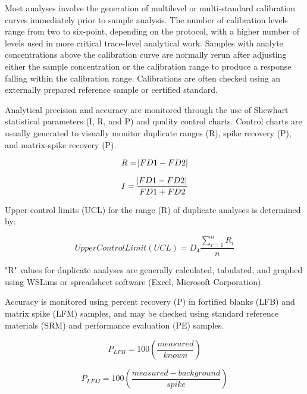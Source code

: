 Most analyses involve the generation of multilevel or multi-standard 
calibration curves immediately prior to sample analysis. The number of 
calibration levels range from two to six-point, depending on the 
protocol, with a higher number of levels used in more critical 
trace-level analytical work. Samples with analyte concentrations above 
the calibration curve are normally rerun after adjusting either the 
sample concentration or the calibration range to produce a response 
falling within the calibration range. Calibrations are often checked 
using an externally prepared reference sample or certified standard.

Analytical precision and accuracy are monitored through the use of 
Shewhart statistical parameters (I, R, and P) and quality control 
charts. Control charts are usually generated to visually monitor 
duplicate ranges (R), spike recovery (P), and matrix-spike recovery (P).

 
\begin{equation}
R = \abs{FD1-FD2}
\end{equation}

\begin{equation}
I = \dfrac{\abs{FD1 - FD2}}{FD1 + FD2}
\end{equation}

\noindent
Upper control limits (UCL) for the range (R) of duplicate analyses is determined by:

\begin{equation}
Upper Control Limit (UCL) = D_{4}\dfrac{\sum_{i=1}^{n} R_{i}}{n}
\end{equation}

\noindent
"R" values for duplicate analyses are generally calculated, tabulated, 
and graphed using WSLims or spreadsheet software (Excel, Microsoft 
Corporation).

\noindent
Accuracy is monitored using percent recovery (P) in fortified blanks 
(LFB) and matrix spike (LFM) samples, and may be checked using standard 
reference materials (SRM) and performance evaluation (PE) samples. 

\begin{equation}
P_{LFB} = 100 (\dfrac{measured}{known})
\end{equation}

\begin{equation}
P_{LFM} = 100 (\dfrac{measured-background}{spike})
\end{equation}


